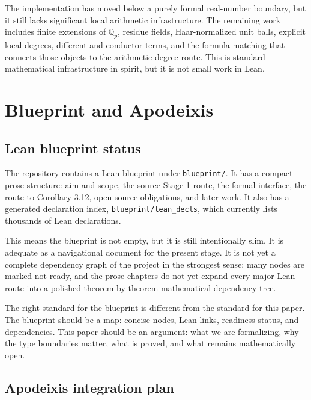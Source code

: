 \documentclass[11pt]{article}
\theoremstyle{plain}
\theoremstyle{definition}
\theoremstyle{remark}
\begin{document}
The implementation has moved below a purely formal real-number boundary, but
it still lacks significant local arithmetic infrastructure.  The remaining
work includes finite extensions of \(\mathbb{Q}_p\), residue fields,
Haar-normalized unit balls, explicit local degrees, different and conductor
terms, and the formula matching that connects those objects to the
arithmetic-degree route.  This is standard mathematical infrastructure in
spirit, but it is not small work in Lean.

\section{Blueprint and Apodeixis}

\subsection{Lean blueprint status}

The repository contains a Lean blueprint under \texttt{blueprint/}.  It has a
compact prose structure: aim and scope, the source Stage 1 route, the formal
interface, the route to Corollary 3.12, open source obligations, and later
work.  It also has a generated declaration index, \texttt{blueprint/lean\_decls},
which currently lists thousands of Lean declarations.

This means the blueprint is not empty, but it is still intentionally slim.  It
is adequate as a navigational document for the present stage.  It is not yet a
complete dependency graph of the project in the strongest sense: many nodes are
marked not ready, and the prose chapters do not yet expand every major Lean
route into a polished theorem-by-theorem mathematical dependency tree.

The right standard for the blueprint is different from the standard for this
paper.  The blueprint should be a map: concise nodes, Lean links, readiness
status, and dependencies.  This paper should be an argument: what we are
formalizing, why the type boundaries matter, what is proved, and what remains
mathematically open.

\subsection{Apodeixis integration plan}
\end{document}
